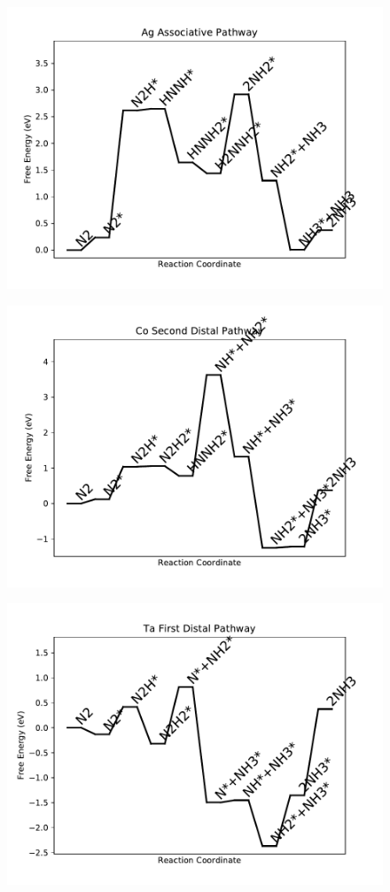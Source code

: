 \begin{figure}
\centering
\includegraphics[width=0.8\linewidth]{data/plots/Ag_associative.pdf}
\end{figure}

\begin{figure}
\centering
\includegraphics[width=0.8\linewidth]{data/plots/Co_distal_2.pdf}
\end{figure}

\begin{figure}
\centering
\includegraphics[width=0.8\linewidth]{data/plots/Ta_distal_1.pdf}
\end{figure}


